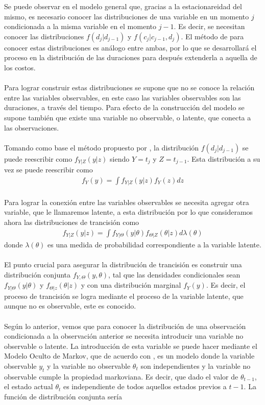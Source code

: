 Se puede observar en el modelo general que, gracias a la estacionareidad del mismo, es necesario conocer las distribuciones de una variable en un momento $j$ condicionada a la misma variable en el momento $j-1$. Es decir, se necesitan conocer las distribuciones $f(d_j|d_{j-1})$ y $f(c_j|c_{j-1},d_j)$. El m\'etodo de para conocer estas distribuciones es an\'alogo entre ambas, por lo que se desarrollar\'a el proceso en la distribuci\'on de las duraciones para despu\'es extenderla a aquella de los costos.\\
\\
Para lograr construir estas distribuciones se supone que no se conoce la relaci\'on entre las variables observables, en este caso las variables observables son las duraciones, a trav\'es del tiempo. Para efecto de la construcci\'on del modelo se supone tambi\'en que existe una variable no observable, o latente, que conecta a las observaciones.\\
\\
Tomando como base el m\'etodo propuesto por \cite{pitt2002constructing}, la distribuci\'on $f(d_j|d_{j-1})$ se puede reescribir como $f_{Y|Z}(y|z)$ siendo $Y=t_j$ y $Z=t_{j-1}$. Esta distribuci\'on a su vez se puede reescribir como
\begin{align*}
f_Y(y)=\int f_{Y|Z}(y|z)f_Y(z)dz
\end{align*}
\\
Para lograr la conexi\'on entre las variables observables se necesita agregar otra variable, que le llamaremos latente, a esta distribuci\'on por lo que consideramos ahora las distribuciones de trancisi\'on como
\begin{align*}
f_{Y|Z}(y|z)=\int f_{Y|\Theta}(y|\theta)f_{\Theta|Z}(\theta|z)d\lambda(\theta)
\end{align*}
donde $\lambda(\theta)$ es una medida de probabilidad correspondiente a la variable latente.\\
\\
El punto crucial para asegurar la distribuci\'on de trancisi\'on es construir una distribuci\'on conjunta $f_{Y,\Theta}(y,\theta)$, tal que las densidades condicionales sean $f_{Y|\Theta}(y|\theta)$ y $f_{\Theta|z}(\theta|z)$ y con una distribuci\'on marginal $f_Y(y)$. Es decir, el proceso de trancisi\'on se logra mediante el proceso de la variable latente, que aunque no es observable, este es conocido.\\
\\
Seg\'un lo anterior, vemos que para conocer la distribuci\'on de una observaci\'on condicionada a la observaci\'on anterior se necesita introducir una variable no observable o latente. La introducci\'on de esta variable se puede hacer mediante el Modelo Oculto de Markov, que de acuerdo con \cite{ghahramani2001introduction}, es un modelo donde la variable observable $y_t$ y la variable no observable $\theta_t$ son independientes y la variable no observable cumple la propiedad markoviana. Es decir, que dado el valor de $\theta_{t-1}$, el estado actual $\theta_t$ es independiente de todos aquellos estados previos a $t-1$. La funci\'on de distribuci\'on conjunta ser\'ia
